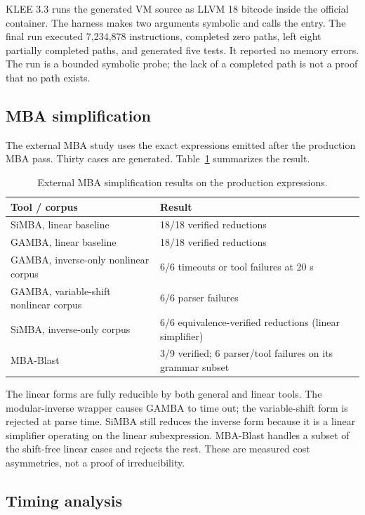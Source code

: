 KLEE 3.3 runs the generated VM source as LLVM 18 bitcode inside the official
container. The harness makes two arguments symbolic and calls the entry. The
final run executed 7,234,878 instructions, completed zero paths, left eight
partially completed paths, and generated five tests. It reported no memory
errors. The run is a bounded symbolic probe; the lack of a completed path is not
a proof that no path exists.

\subsection{MBA simplification}

The external MBA study uses the exact expressions emitted after the production
MBA pass. Thirty cases are generated. Table~\ref{tab:mba} summarizes the result.

\begin{table}[htbp]
\centering
\small
\caption{External MBA simplification results on the production expressions.}
\label{tab:mba}
\begin{tabularx}{\textwidth}{@{}>{\raggedright\arraybackslash}p{}X@{}}
\toprule
Tool / corpus & Result \\
\midrule
SiMBA, linear baseline & 18/18 verified reductions \\
GAMBA, linear baseline & 18/18 verified reductions \\
GAMBA, inverse-only nonlinear corpus & 6/6 timeouts or tool failures at 20 s \\
GAMBA, variable-shift nonlinear corpus & 6/6 parser failures \\
SiMBA, inverse-only corpus & 6/6 equivalence-verified reductions (linear simplifier) \\
MBA-Blast & 3/9 verified; 6 parser/tool failures on its grammar subset \\
\bottomrule
\end{tabularx}
\end{table}

The linear forms are fully reducible by both general and linear tools. The
modular-inverse wrapper causes GAMBA to time out; the variable-shift form is
rejected at parse time. SiMBA still reduces the inverse form because it is a
linear simplifier operating on the linear subexpression. MBA-Blast handles a
subset of the shift-free linear cases and rejects the rest. These are measured
cost asymmetries, not a proof of irreducibility.

\subsection{Timing analysis}

